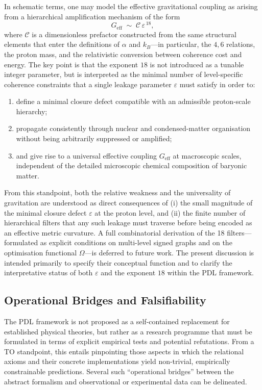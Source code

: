 \documentclass[11pt,a4paper]{article}
\begin{document}
In schematic terms, one may model the effective gravitational coupling as arising from a hierarchical amplification mechanism of the form
\[
  G_{\text{eff}} \;\sim\; \mathcal{C} \,\varepsilon^{\,18},
\]
where $\mathcal{C}$ is a dimensionless prefactor constructed from the same structural elements that enter the definitions of $\alpha$ and $k_B$—in particular, the $4,6$ relations, the proton mass, and the relativistic conversion between coherence cost and energy. The key point is that the exponent $18$ is not introduced as a tunable integer parameter, but is interpreted as the minimal number of level-specific coherence constraints that a single leakage parameter $\varepsilon$ must satisfy in order to:

\begin{enumerate}
  \item define a minimal closure defect compatible with an admissible proton-scale hierarchy;
  \item propagate consistently through nuclear and condensed-matter organisation without being arbitrarily suppressed or amplified;
  \item and give rise to a universal effective coupling $G_{\text{eff}}$ at macroscopic scales, independent of the detailed microscopic chemical composition of baryonic matter.
\end{enumerate}

From this standpoint, both the relative weakness and the universality of gravitation are understood as direct consequences of (i) the small magnitude of the minimal closure defect $\varepsilon$ at the proton level, and (ii) the finite number of hierarchical filters that any such leakage must traverse before being encoded as an effective metric curvature. A full combinatorial derivation of the 18 filters—formulated as explicit conditions on multi-level signed graphs and on the optimisation functional $\Omega$—is deferred to future work. The present discussion is intended primarily to specify their conceptual function and to clarify the interpretative status of both $\varepsilon$ and the exponent $18$ within the PDL framework.

\subsection{Operational Bridges and Falsifiability}

The PDL framework is not proposed as a self-contained replacement for established physical theories, but rather as a research programme that must be formulated in terms of explicit empirical tests and potential refutations. From a TO standpoint, this entails pinpointing those aspects in which the relational axioms and their concrete implementations yield non-trivial, empirically constrainable predictions. Several such “operational bridges” between the abstract formalism and observational or experimental data can be delineated.
\end{document}
